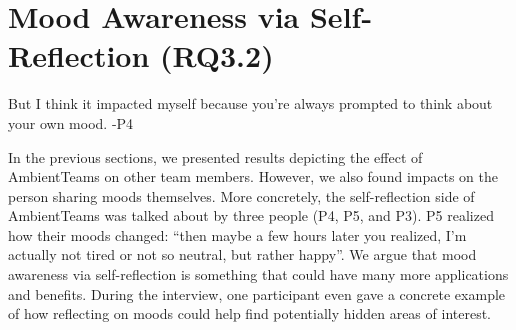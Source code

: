 






\section{Mood Awareness via Self-Reflection (RQ3.2)}

\begin{displayquote}
    But I think it impacted myself because you're always prompted to think about your own mood. -P4
\end{displayquote}

In the previous sections, we presented results depicting the effect of AmbientTeams on other team members. However, we also found impacts on the person sharing moods themselves. More concretely, the self-reflection side of AmbientTeams was talked about by three people (P4, P5, and P3). P5 realized how their moods changed: \enquote{then maybe a few hours later you realized, I'm actually not tired or not so neutral, but rather happy}. We argue that mood awareness via self-reflection is something that could have many more applications and benefits. During the interview, one participant even gave a concrete example of how reflecting on moods could help find potentially hidden areas of interest.

